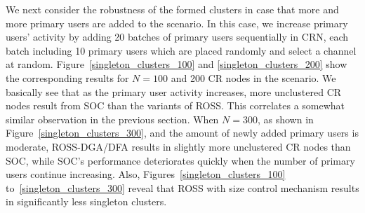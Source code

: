 \documentclass[times]{ettauth}
\theoremstyle{mytheoremstyle}
\theoremstyle{mytheoremstyle}
\theoremstyle{mytheoremstyle}
\begin{document}
We next consider the robustness of the formed clusters in case that more and more primary users are added to the scenario.
In this case, we increase primary users' activity by adding 20 batches of primary users sequentially in CRN, each batch including 10 primary users which are placed randomly and select a channel at random. 
Figure~\ref{singleton_clusters_100} and \ref{singleton_clusters_200} show the corresponding results for $N=100$ and 200 CR nodes in the scenario.
We basically see that as the primary user activity increases, more unclustered CR nodes result from SOC than the variants of ROSS.
This correlates a somewhat similar observation in the previous section.
When $N=300$, as shown in Figure~\ref{singleton_clusters_300}, and the amount of newly added primary users is moderate, ROSS-DGA/DFA results in slightly more unclustered CR nodes than SOC, while SOC's performance deteriorates quickly when the number of primary users continue increasing.
Also, Figures~\ref{singleton_clusters_100} to~\ref{singleton_clusters_300} reveal that ROSS with size control mechanism results in significantly less singleton clusters.
\end{document}
